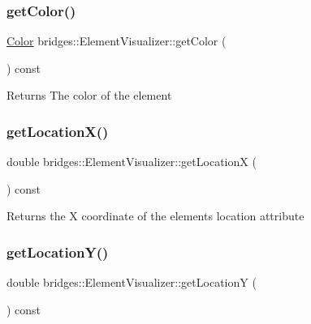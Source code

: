 \subsubsection{\texorpdfstring{get\+Color()}{getColor()}}
{\footnotesize\ttfamily \mbox{\hyperlink{classbridges_1_1_color}{Color}} bridges\+::\+Element\+Visualizer\+::get\+Color (\begin{DoxyParamCaption}{ }\end{DoxyParamCaption}) const\hspace{0.3cm}{\ttfamily [inline]}}

\begin{DoxyReturn}{Returns}
The color of the element 
\end{DoxyReturn}
\mbox{\label{classbridges_1_1_element_visualizer_ac944b8fb1b5b27454cf04145cb711ccc}} 
\subsubsection{\texorpdfstring{get\+Location\+X()}{getLocationX()}}
{\footnotesize\ttfamily double bridges\+::\+Element\+Visualizer\+::get\+LocationX (\begin{DoxyParamCaption}{ }\end{DoxyParamCaption}) const\hspace{0.3cm}{\ttfamily [inline]}}

\begin{DoxyReturn}{Returns}
the X coordinate of the element\textquotesingle{}s location attribute 
\end{DoxyReturn}
\mbox{\label{classbridges_1_1_element_visualizer_a0c17d12888f98e710ed0d5ab6e142f8e}} 
\subsubsection{\texorpdfstring{get\+Location\+Y()}{getLocationY()}}
{\footnotesize\ttfamily double bridges\+::\+Element\+Visualizer\+::get\+LocationY (\begin{DoxyParamCaption}{ }\end{DoxyParamCaption}) const\hspace{0.3cm}{\ttfamily [inline]}}

